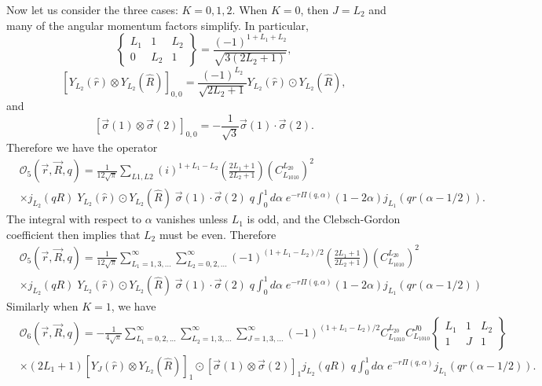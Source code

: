 \documentclass[12pt,letterpaper]{book}
\begin{document}
Now let us consider the three cases: $K=0,1,2$. When $K=0$, then $J=L_2$ and many of the angular momentum factors simplify. In particular,
\begin{equation}
\left\{\begin{array}{ccc}
L_1 & 1 & L_2\\
0 & L_2 & 1
\end{array}\right\}=\frac{(-1)^{1+L_1+L_2}}{\sqrt{3(2L_2+1)}},
\end{equation}
\begin{equation}
\left[Y_{L_2}(\hat{r})\otimes Y_{L_2}(\hat{R})\right]_{0,0}=\frac{(-1)^{L_2}}{\sqrt{2L_2+1}}Y_{L_2}(\hat{r})\odot Y_{L_2}(\hat{R}),
\end{equation}
and
\begin{equation}
\left[\vec{\sigma}(1)\otimes\vec{\sigma}(2)\right]_{0,0}=-\frac{1}{\sqrt{3}}\vec{\sigma}(1)\cdot\vec{\sigma}(2).
\end{equation}
Therefore we have the operator
\begin{equation}
\begin{split}
&\mathcal{O}_5(\vec{r},\vec{R},q)=\frac{1}{12\sqrt{\pi}}\sum_{L1,L2}(i)^{1+L_1-L_2}\left(\frac{2L_1+1}{2L_2+1}\right)\left(C_{L_1010}^{L_20}\right)^2\\
&\times j_{L_2}(q R)\;Y_{L_2}(\hat{r})\odot Y_{L_2}(\hat{R})\;\vec{\sigma}(1)\cdot\vec{\sigma}(2)\;q\int_0^1 d\alpha\;e^{-r\Pi(q,\alpha)}(1-2\alpha)j_{L_1}(q r(\alpha-1/2)).
\end{split}
\end{equation}
The integral with respect to $\alpha$ vanishes unless $L_1$ is odd, and the Clebsch-Gordon coefficient then implies that $L_2$ must be even. Therefore
\begin{equation}
\begin{split}
&\mathcal{O}_5(\vec{r},\vec{R},q)=\frac{1}{12\sqrt{\pi}}\sum_{L_1=1,3,...}^{\infty}\sum_{L_2=0,2,...}^{\infty}(-1)^{(1+L_1-L_2)/2}\left(\frac{2L_1+1}{2L_2+1}\right)\left(C_{L_1010}^{L_20}\right)^2\\
&\times j_{L_2}(q R)\;Y_{L_2}(\hat{r})\odot Y_{L_2}(\hat{R})\;\vec{\sigma}(1)\cdot\vec{\sigma}(2)\;q\int_0^1 d\alpha\;e^{-r\Pi(q,\alpha)}(1-2\alpha)j_{L_1}(q r(\alpha-1/2))
\end{split}
\end{equation}
Similarly when $K=1$, we have
\begin{equation}
\begin{split}
&\mathcal{O}_6(\vec{r},\vec{R},q)=-\frac{1}{4\sqrt{\pi}}\sum_{L_1=0,2,...}^{\infty}\sum_{L_2=1,3,...}^{\infty}\sum_{J=1,3,...}^{\infty}(-1)^{(1+L_1-L_2)/2}C_{L_1010}^{L_20}C_{L_1010}^{J0}\left\{\begin{array}{ccc}
L_1 & 1 & L_2\\
1 & J & 1
\end{array}\right\}\\
&\times(2L_1+1)\left[Y_J(\hat{r})\otimes Y_{L_2}(\hat{R})\right]_1\odot\left[\vec{\sigma}(1)\otimes\vec{\sigma}(2)\right]_1 j_{L_2}(q R)\;q\int_0^1d\alpha\;e^{-r\Pi(q,\alpha)}j_{L_1}(qr(\alpha-1/2)).
\end{split}
\end{equation}
\end{document}
